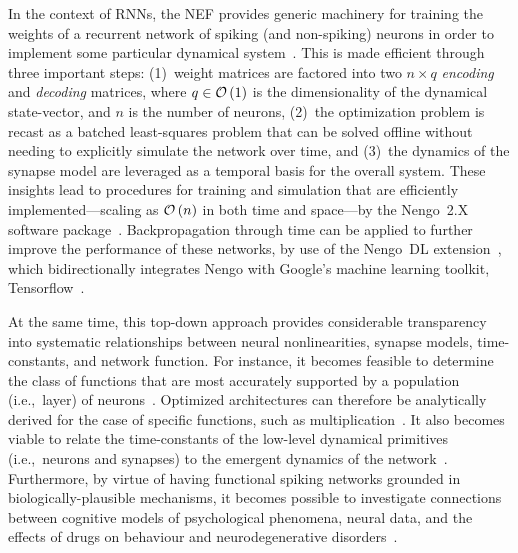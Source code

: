 In the context of RNNs, the NEF provides generic machinery for training the weights of a recurrent network of spiking (and non-spiking) neurons in order to implement some particular dynamical system~\citep{dynamicspatent}.
This is made efficient through three important steps: (1)~weight matrices are factored into two $n \times q$ \emph{encoding} and \emph{decoding} matrices, where $q \in \mathcal{O}\left({1}\right)$ is the dimensionality of the dynamical state-vector, and $n$ is the number of neurons, (2)~the optimization problem is recast as a batched least-squares problem that can be solved offline without needing to explicitly simulate the network over time, and (3)~the dynamics of the synapse model are leveraged as a temporal basis for the overall system.
These insights lead to procedures for training and simulation that are efficiently implemented---scaling as $\mathcal{O}\left({n}\right)$ in both time and space---by the Nengo~2.X software package~\citep{bekolay2014}.
Backpropagation through time can be applied to further improve the performance of these networks, by use of the Nengo~DL extension~\citep{hunsberger2018, rasmussen2018nengodl, blouw2018a}, which bidirectionally integrates Nengo with Google's machine learning toolkit, Tensorflow~\citep{abadi2016tensorflow}.

At the same time, this top-down approach provides considerable transparency into systematic relationships between neural nonlinearities, synapse models, time-constants, and network function.
For instance, it becomes feasible to determine the class of functions that are most accurately supported by a population (i.e.,~layer) of neurons~\citep[][pp.~185--217]{eliasmith2003a}.
Optimized architectures can therefore be analytically derived for the case of specific functions, such as multiplication~\citep{jgosmann2015}.
It also becomes viable to relate the time-constants of the low-level dynamical primitives (i.e.,~neurons and synapses) to the emergent dynamics of the network~\citep{voelker2018}.
Furthermore, by virtue of having functional spiking networks grounded in biologically-plausible mechanisms, it becomes possible to investigate connections between cognitive models of psychological phenomena, neural data, and the effects of drugs on behaviour and neurodegenerative disorders~\citep{eliasmith2013build, eliasmith2016biospaun, duggins2017b}.

